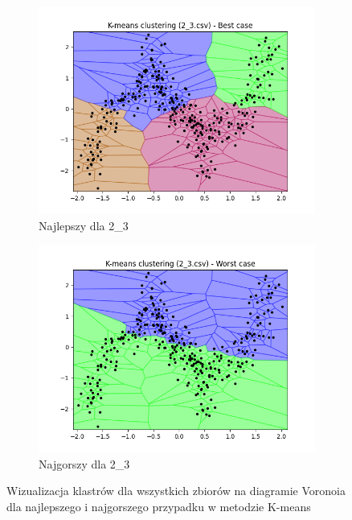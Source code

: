 \documentclass[12pt]{article}
\begin{document}
\begin{figure}[H]
\begin{subfigure}[b]{0.24\textwidth}
        \includegraphics[width=\linewidth]{img/exp_1/kmeans/2_3_best.png}
        \caption{Najlepszy dla 2\_3}
    \end{subfigure}
    \hfill
    \begin{subfigure}[b]{0.24\textwidth}
        \includegraphics[width=\linewidth]{img/exp_1/kmeans/2_3_worst.png}
        \caption{Najgorszy dla 2\_3}
    \end{subfigure}
    \caption{\centering Wizualizacja klastrów dla wszystkich zbiorów na diagramie Voronoia dla najlepszego i najgorszego przypadku w metodzie K-means}
\end{figure}


\newpage
\end{document}
